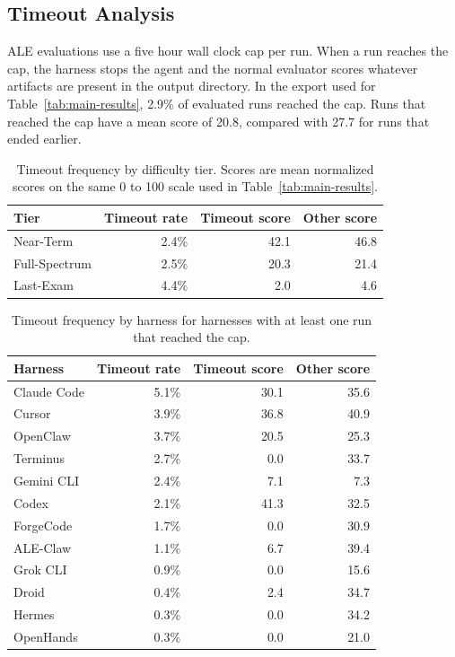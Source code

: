 \subsection{Timeout Analysis}
\label{app:timeout-analysis}

ALE evaluations use a five hour wall clock cap per run.
When a run reaches the cap, the harness stops the agent and the normal evaluator scores whatever artifacts are present in the output directory.
In the export used for Table~\ref{tab:main-results}, 2.9\% of evaluated runs reached the cap.
Runs that reached the cap have a mean score of 20.8, compared with 27.7 for runs that ended earlier.

\begin{table}[h]
\centering
\caption{Timeout frequency by difficulty tier. Scores are mean normalized scores on the same 0 to 100 scale used in Table~\ref{tab:main-results}.}
\label{tab:timeout-by-tier}
\begin{tabular}{lrrr}
\toprule
Tier & Timeout rate & Timeout score & Other score \\
\midrule
Near-Term & 2.4\% & 42.1 & 46.8 \\
Full-Spectrum & 2.5\% & 20.3 & 21.4 \\
Last-Exam & 4.4\% & 2.0 & 4.6 \\
\bottomrule
\end{tabular}
\end{table}

\begin{table}[h]
\centering
\caption{Timeout frequency by harness for harnesses with at least one run that reached the cap.}
\label{tab:timeout-by-harness}
\begin{tabular}{lrrr}
\toprule
Harness & Timeout rate & Timeout score & Other score \\
\midrule
Claude Code & 5.1\% & 30.1 & 35.6 \\
Cursor & 3.9\% & 36.8 & 40.9 \\
OpenClaw & 3.7\% & 20.5 & 25.3 \\
Terminus & 2.7\% & 0.0 & 33.7 \\
Gemini CLI & 2.4\% & 7.1 & 7.3 \\
Codex & 2.1\% & 41.3 & 32.5 \\
ForgeCode & 1.7\% & 0.0 & 30.9 \\
ALE-Claw & 1.1\% & 6.7 & 39.4 \\
Grok CLI & 0.9\% & 0.0 & 15.6 \\
Droid & 0.4\% & 2.4 & 34.7 \\
Hermes & 0.3\% & 0.0 & 34.2 \\
OpenHands & 0.3\% & 0.0 & 21.0 \\
\bottomrule
\end{tabular}
\end{table}
